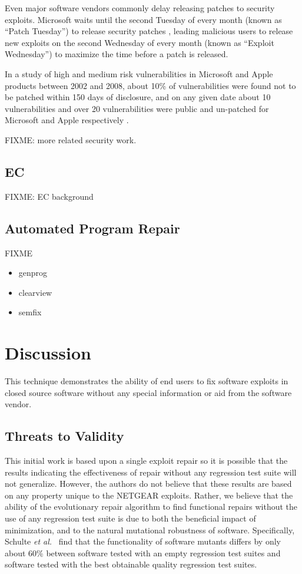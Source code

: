 \documentclass{sigcomm-alternate}
\begin{document}
Even major software vendors commonly delay releasing patches to
security exploits.  Microsoft waits until the second Tuesday of every
month (known as ``Patch Tuesday'') to release security patches
\cite{lemos2003microsoft}, leading malicious users to release new
exploits on the second Wednesday of every month (known as ``Exploit
Wednesday'') to maximize the time before a patch is released.

In a study of high and medium risk vulnerabilities in Microsoft and
Apple products between 2002 and 2008, about 10\% of
vulnerabilities were found not to be patched within 150 days of
disclosure, and on any given date about 10 vulnerabilities and over 20
vulnerabilities were public and un-patched for Microsoft and Apple
respectively \cite{frei20080}.

FIXME: more related security work.

\subsection{EC}
\label{sec-5-2}

FIXME: EC background

\subsection{Automated Program Repair}
\label{sec-5-3}

FIXME

\begin{itemize}
\item genprog
\item clearview
\item semfix
\end{itemize}

\section{Discussion}
\label{sec-6}
This technique demonstrates the ability of end users to fix software
exploits in closed source software without any special information or
aid from the software vendor.

\subsection{Threats to Validity}
\label{sec-6-1}
This initial work is based upon a single exploit repair so it is
possible that the results indicating the effectiveness of repair
without any regression test suite will not generalize.  However, the
authors do not believe that these results are based on any property
unique to the NETGEAR exploits. Rather, we believe that the ability of
the evolutionary repair algorithm to find functional repairs without
the use of any regression test suite is due to both the beneficial
impact of minimization, and to the natural mutational robustness of
software. Specifically, Schulte \emph{et al.}~\cite{schulte2013software} 
find that the functionality of software mutants differs by only about 60\%
between software tested with an empty regression test suites and software
tested with the best obtainable quality regression test suites.
\end{document}
